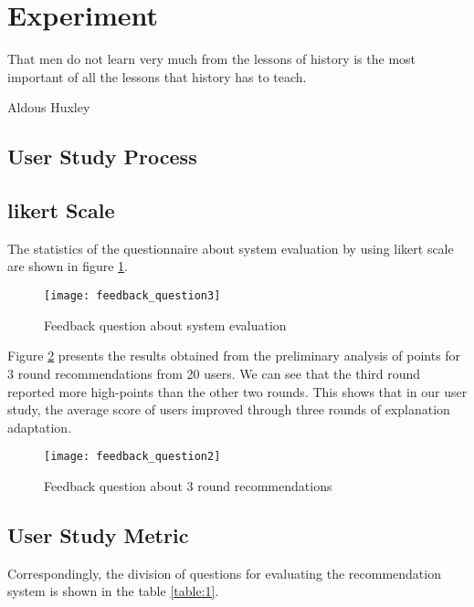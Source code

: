 
\section{Experiment}
\label{ch:experiment}

\epigraph{That men do not learn very much from the lessons of history is the most important of all the lessons that history has to teach.}{Aldous Huxley}

\subsection{User Study Process}

\subsection{likert Scale}
The statistics of the questionnaire about system evaluation by using likert scale are shown in figure \ref{figure:1}.

\begin{figure}[h]
\caption{Feedback question about system evaluation}
\label{figure:1}
\centering
\texttt{[image: feedback\_question3]}
\end{figure}

Figure \ref{figure:2} presents the results obtained from the preliminary analysis of points for 3 round recommendations from 20 users. We can see that the third round reported more high-points than the other two rounds. This shows that in our user study, the average score of users improved through three rounds of explanation adaptation.

\begin{figure}[h]
\caption{Feedback question about 3 round recommendations}
\label{figure:2}
\centering
\texttt{[image: feedback\_question2]}
\end{figure}



\subsection{User Study Metric}
Correspondingly, the division of questions for evaluating the recommendation system is shown in the table \ref{table:1}.

